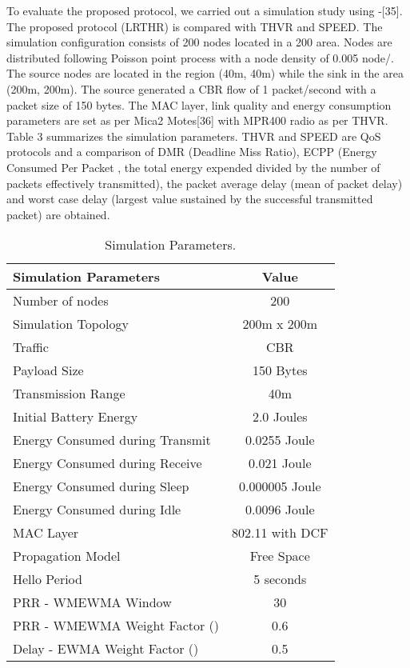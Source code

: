 \documentclass[fleqn,twoside]{article}
\begin{document}
To evaluate the proposed protocol, we carried out a simulation study using -[35]. The proposed 
protocol (LRTHR) is compared with THVR and SPEED. The simulation configuration consists of 200 nodes 
located in a 200  area. Nodes are distributed following Poisson point process with a node density of 0.005 node/. The 
source nodes are located in the region (40m, 40m) while the sink in the area (200m, 200m). The source generated a CBR 
flow of 1 packet/second with a packet size of 150 bytes. 
\vskip 2mm
The MAC layer, link quality and energy consumption parameters are
set as per Mica2 Motes[36] with MPR400 radio as per THVR. Table 3 summarizes the simulation parameters.
THVR and SPEED are QoS protocols and a comparison of DMR (Deadline Miss Ratio), ECPP (Energy Consumed Per Packet , the total
energy expended divided by the number of packets effectively transmitted), the packet average delay (mean of packet delay) and 
worst case delay (largest value sustained by the successful transmitted packet) are obtained.

\begin{table}[ht]
\centering
\caption{Simulation Parameters.}
\begin{tiny}
\begin{center}
\begin{tabular}{|l|c| } \hline
{\bf Simulation Parameters} & {\bf  Value} \\ \hline
{Number of nodes} 		&{200} \\ \hline
{Simulation Topology} 		&{200m x 200m} \\ \hline
{Traffic} 			&{CBR} \\ \hline
{Payload Size} 			&{150 Bytes} \\ \hline
{Transmission Range}			&{40m} \\ \hline
{Initial Battery Energy }		&{2.0 Joules} \\ \hline
{Energy Consumed during Transmit }	&{0.0255 Joule} \\ \hline
{Energy Consumed during Receive }	&{0.021 Joule} \\ \hline
{Energy Consumed during Sleep }		&{0.000005 Joule} \\ \hline
{Energy Consumed during Idle }		&{0.0096 Joule} \\ \hline
{MAC Layer}			&{802.11 with DCF} \\ \hline
{Propagation Model}		&{Free Space} \\ \hline
{Hello Period} 			&{5 seconds} \\ \hline
{PRR - WMEWMA Window} 			&{30} \\ \hline
{PRR - WMEWMA Weight Factor ()}	&{0.6} \\ \hline
{Delay - EWMA Weight Factor ()}	&{0.5} \\ \hline
\end{tabular}
\end{center}
\end{tiny}
\end{table}
\end{document}
